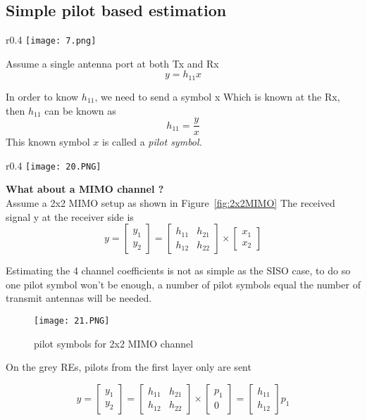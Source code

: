 \subsection{Simple pilot based estimation}
\label{subsection:SPBE}

\begin{wrapfigure}{r}{0.4\textwidth}
    \centering
    \texttt{[image: 7.png]}
    \caption{Single Tx Single Rx}
\end{wrapfigure}
Assume a single antenna port at both Tx and Rx
\[ y = h_{11}x  \]

In order to know $h_{11}$, we need to send  a symbol x 
Which is known at the Rx, then $h_{11}$ can be known as                  
\[h_{11} = \frac{y}{x}\]
This known symbol $x$ is called a \emph{pilot symbol.}

\begin{wrapfigure}{r}{0.4\textwidth}
    \centering
    \texttt{[image: 20.PNG]}
    \caption{2x2 MIMO setup}
    \label{fig:2x2MIMO}
\end{wrapfigure}

\textbf{What about a MIMO channel ?} \\
Assume a 2x2 MIMO setup as shown in Figure~\ref{fig:2x2MIMO}
\newline
The received signal y at the receiver side is 
\[y =\begin{bmatrix} y_1 \\ y_2 \end{bmatrix} = \begin{bmatrix} h_{11} & h_{21}  \\ h_{12} & h_{22} \end{bmatrix} \times \begin{bmatrix} x_1 \\ x_2 \end{bmatrix}  \]

Estimating the 4 channel coefficients is not as simple as the SISO case, to do so one pilot symbol won't be enough, a number of pilot symbols equal the number of transmit antennas will be needed.

\begin{figure}[ht]
\centering
\texttt{[image: 21.PNG]}
\caption{pilot symbols for 2x2 MIMO channel}
\end{figure} 

On the grey REs, pilots from the first layer only are sent

\[y =\begin{bmatrix} y_1 \\ y_2 \end{bmatrix} = \begin{bmatrix} h_{11} & h_{21}  \\ h_{12} & h_{22} \end{bmatrix} \times \begin{bmatrix} p_1 \\ 0 \end{bmatrix} =  \begin{bmatrix} h_{11} \\ h_{12}  \end{bmatrix}p_1\]


